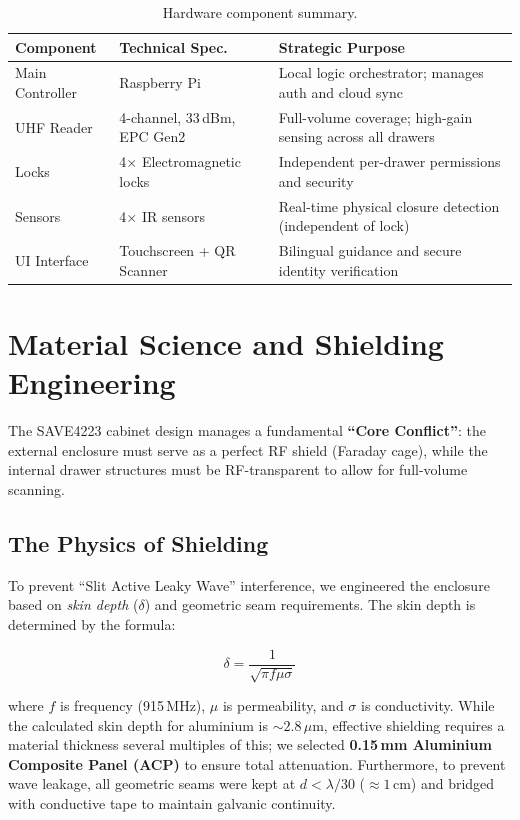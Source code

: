\documentclass[12pt, a4paper]{article}
\begin{document}
\begin{table}[H]
\centering
\caption{Hardware component summary.}
\begin{tabularx}{\textwidth}{llX}
\toprule
\textbf{Component} & \textbf{Technical Spec.} & \textbf{Strategic Purpose} \\
\midrule
Main Controller & Raspberry Pi & Local logic orchestrator; manages auth and cloud sync \\
UHF Reader      & 4-channel, 33\,dBm, EPC Gen2 & Full-volume coverage; high-gain sensing across all drawers \\
Locks           & 4$\times$ Electromagnetic locks & Independent per-drawer permissions and security \\
Sensors         & 4$\times$ IR sensors & Real-time physical closure detection (independent of lock) \\
UI Interface    & Touchscreen + QR Scanner & Bilingual guidance and secure identity verification \\
\bottomrule
\end{tabularx}
\end{table}

\section{Material Science and Shielding Engineering}
\label{sec:shielding}

The SAVE4223 cabinet design manages a fundamental \textbf{``Core Conflict''}: the external enclosure must serve as a perfect RF shield (Faraday cage), while the internal drawer structures must be RF-transparent to allow for full-volume scanning.

\subsection{The Physics of Shielding}

To prevent ``Slit Active Leaky Wave'' interference, we engineered the enclosure based on \emph{skin depth} ($\delta$) and geometric seam requirements.
The skin depth is determined by the formula:

\begin{equation}
  \delta = \frac{1}{\sqrt{\pi f \mu \sigma}}
\end{equation}

where $f$ is frequency (915\,MHz), $\mu$ is permeability, and $\sigma$ is conductivity.
While the calculated skin depth for aluminium is $\sim 2.8\,\mu$m, effective shielding requires a material thickness several multiples of this; we selected \textbf{0.15\,mm Aluminium Composite Panel (ACP)} to ensure total attenuation.
Furthermore, to prevent wave leakage, all geometric seams were kept at $d < \lambda/30$ ($\approx 1$\,cm) and bridged with conductive tape to maintain galvanic continuity.
\end{document}
